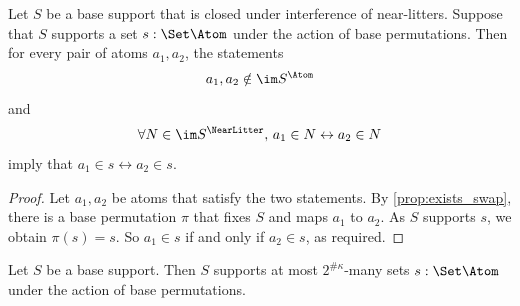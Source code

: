 \begin{proposition}
  \label{prop:supports_atoms_iff}
  Let \( S \) be a base support that is closed under interference of near-litters.
  Suppose that \( S \) supports a set \( s : \Set \Atom \) under the action of base permutations.
  Then for every pair of atoms \( a_1, a_2 \), the statements
  \[ a_1, a_2 \notin \im S^\Atom \]
  and
  \[ \forall N \in \im S^\NearLitter,\, a_1 \in N \leftrightarrow a_2 \in N \]
  imply that \( a_1 \in s \leftrightarrow a_2 \in s \).
\end{proposition}
\begin{proof}
  Let \( a_1, a_2 \) be atoms that satisfy the two statements.
  By \cref{prop:exists_swap}, there is a base permutation \( \pi \) that fixes \( S \) and maps \( a_1 \) to \( a_2 \).
  As \( S \) supports \( s \), we obtain \( \pi(s) = s \).
  So \( a_1 \in s \) if and only if \( a_2 \in s \), as required.
\end{proof}
\begin{proposition}
  \label{prop:card_supports_atoms}
  Let \( S \) be a base support.
  Then \( S \) supports at most \( 2^{\#\kappa} \)-many sets \( s : \Set \Atom \) under the action of base permutations.
\end{proposition}
